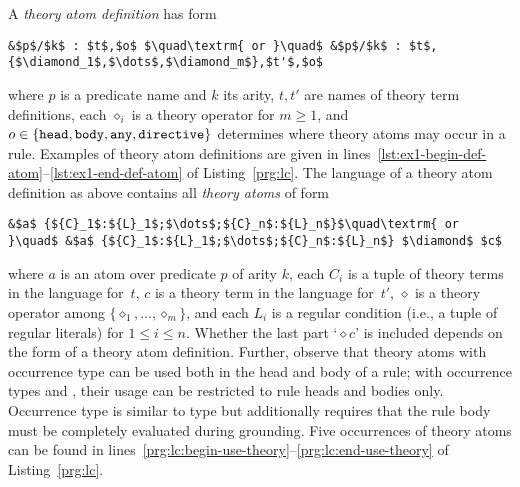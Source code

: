 A \emph{theory atom definition} has form
\begin{lstlisting}[numbers=none,mathescape=t]
&$p$/$k$ : $t$,$o$ $\quad\textrm{ or }\quad$ &$p$/$k$ : $t$,{$\diamond_1$,$\dots$,$\diamond_m$},$t'$,$o$
\end{lstlisting}
where $p$ is a predicate name and $k$ its arity,
$t,t'$ are names of theory term definitions,
each $\diamond_i$ is a theory operator for $m\geq 1$,
and
\(
o\in\{\texttt{head},\texttt{body},\texttt{any}, \texttt{directive}\}
\)
determines where theory atoms may occur in a rule.
%
Examples of theory atom definitions are given in lines~\ref{lst:ex1-begin-def-atom}--\ref{lst:ex1-end-def-atom} of Listing~\ref{prg:lc}.
The language of a theory atom definition as above contains all \emph{theory atoms} of form
\begin{lstlisting}[numbers=none,mathescape=t]
&$a$ {${C}_1$:${L}_1$;$\dots$;${C}_n$:${L}_n$}$\quad\textrm{ or }\quad$ &$a$ {${C}_1$:${L}_1$;$\dots$;${C}_n$:${L}_n$} $\diamond$ $c$
\end{lstlisting}
where $a$ is an atom over predicate $p$ of arity $k$,
each ${C}_i$ is a tuple of theory terms in the language for~$t$,
$c$ is a theory term in the language for~$t'$,
$\diamond$ is a theory operator among $\{ \diamond_1, \dots, \diamond_m \}$,
and each ${L}_i$ is a regular condition (i.e., a tuple of regular literals)
for $1\leq i\leq n$.
Whether the last part `${}\diamond c$' is included depends on the form of a theory atom definition.
%
Further, observe that theory atoms with occurrence type  can be used both in the head and body of a rule;
with occurrence types  and , their usage can be restricted to rule heads and bodies only.
Occurrence type  is similar to type  but additionally requires that the rule body must be completely evaluated during grounding.
Five occurrences of theory atoms can be found in lines~\ref{prg:lc:begin-use-theory}--\ref{prg:lc:end-use-theory} of Listing~\ref{prg:lc}.

